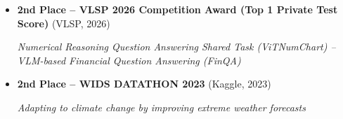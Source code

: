 

\begin{itemize}
  \item \textbf{2nd Place -- VLSP 2026 Competition Award (Top 1 Private Test Score)} (VLSP, 2026)

  \textit{Numerical Reasoning Question Answering Shared Task (ViTNumChart) -- VLM-based Financial Question Answering (FinQA)}

  \item \textbf{2nd Place -- WIDS DATATHON 2023} (Kaggle, 2023)

  \textit{Adapting to climate change by improving extreme weather forecasts}
\end{itemize}

